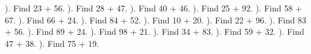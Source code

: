 \documentclass{article}%
\begin{document}
). Find 23 + 56.%
\newline%
\newline%
). Find 28 + 47.%
\newline%
\newline%
). Find 40 + 46.%
\newline%
\newline%
). Find 25 + 92.%
\newline%
\newline%
). Find 58 + 67.%
\newline%
\newline%
). Find 66 + 24.%
\newline%
\newline%
). Find 84 + 52.%
\newline%
\newline%
). Find 10 + 20.%
\newline%
\newline%
). Find 22 + 96.%
\newline%
\newline%
). Find 83 + 56.%
\newline%
\newline%
). Find 89 + 24.%
\newline%
\newline%
). Find 98 + 21.%
\newline%
\newline%
). Find 34 + 83.%
\newline%
\newline%
). Find 59 + 32.%
\newline%
\newline%
). Find 47 + 38.%
\newline%
\newline%
). Find 75 + 19.%
\end{document}
